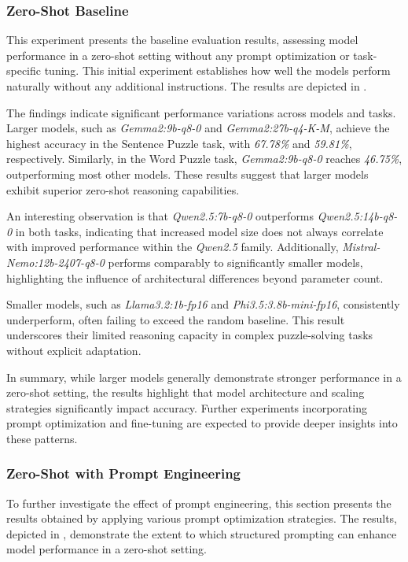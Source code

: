 \subsubsection{Zero-Shot Baseline}
This experiment presents the baseline evaluation results, assessing model performance in a zero-shot setting without any prompt optimization or task-specific tuning. This initial experiment establishes how well the models perform naturally without any additional instructions. The results are depicted in .

The findings indicate significant performance variations across models and tasks. Larger models, such as \textit{Gemma2:9b-q8-0} and \textit{Gemma2:27b-q4-K-M}, achieve the highest accuracy in the Sentence Puzzle task, with \textit{67.78\%} and \textit{59.81\%}, respectively. Similarly, in the Word Puzzle task, \textit{Gemma2:9b-q8-0} reaches \textit{46.75\%}, outperforming most other models. These results suggest that larger models exhibit superior zero-shot reasoning capabilities.

An interesting observation is that \textit{Qwen2.5:7b-q8-0} outperforms \textit{Qwen2.5:14b-q8-0} in both tasks, indicating that increased model size does not always correlate with improved performance within the \textit{Qwen2.5} family. Additionally, \textit{Mistral-Nemo:12b-2407-q8-0} performs comparably to significantly smaller models, highlighting the influence of architectural differences beyond parameter count.

Smaller models, such as \textit{Llama3.2:1b-fp16} and \textit{Phi3.5:3.8b-mini-fp16}, consistently underperform, often failing to exceed the random baseline. This result underscores their limited reasoning capacity in complex puzzle-solving tasks without explicit adaptation.

In summary, while larger models generally demonstrate stronger performance in a zero-shot setting, the results highlight that model architecture and scaling strategies significantly impact accuracy. Further experiments incorporating prompt optimization and fine-tuning are expected to provide deeper insights into these patterns.

\subsubsection{Zero-Shot with Prompt Engineering}
To further investigate the effect of prompt engineering, this section presents the results obtained by applying various prompt optimization strategies. The results, depicted in , demonstrate the extent to which structured prompting can enhance model performance in a zero-shot setting.

